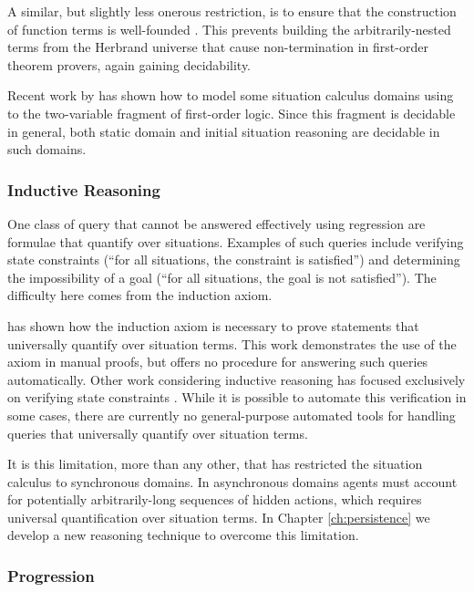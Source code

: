 A similar, but slightly less onerous restriction, is to ensure that
the construction of function terms is well-founded \citep{levesque04krr_book}.
This prevents building the arbitrarily-nested terms from the Herbrand
universe that cause non-termination in first-order theorem provers,
again gaining decidability.

Recent work by \citet{yu07twovar_sitcalc} has shown how to model
some situation calculus domains using to the two-variable fragment
of first-order logic. Since this fragment is decidable in general,
both static domain and initial situation reasoning are decidable in
such domains.


\subsubsection{Inductive Reasoning}

One class of query that cannot be answered effectively using regression
are formulae that quantify over situations. Examples of such queries
include verifying state constraints ({}``for all situations, the
constraint is satisfied'') and determining the impossibility of a
goal ({}``for all situations, the goal is not satisfied''). The
difficulty here comes from the induction axiom.

\citet{Reiter93proving} has shown how the induction axiom is necessary
to prove statements that universally quantify over situation terms.
This work demonstrates the use of the axiom in manual proofs, but
offers no procedure for answering such queries automatically. Other
work considering inductive reasoning has focused exclusively on verifying
state constraints \citep{Lin94-StateConstraints,bertossi96automating}.
While it is possible to automate this verification in some cases,
there are currently no general-purpose automated tools for handling
queries that universally quantify over situation terms.

It is this limitation, more than any other, that has restricted the
situation calculus to synchronous domains. In asynchronous domains
agents must account for potentially arbitrarily-long sequences of
hidden actions, which requires universal quantification over situation
terms. In Chapter \ref{ch:persistence} we develop a new reasoning
technique to overcome this limitation.


\subsubsection{Progression\label{sec:Background:Progression}}

